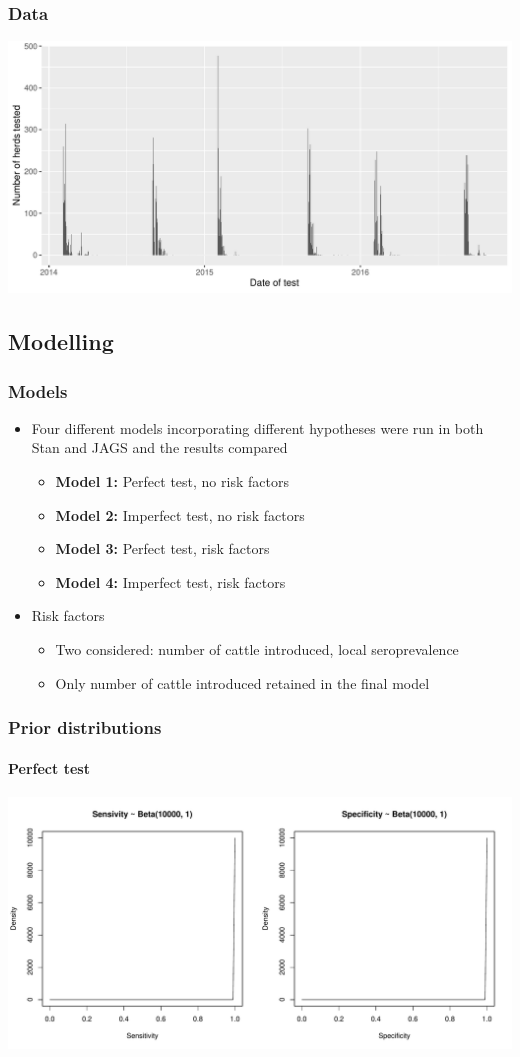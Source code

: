 \documentclass{beamer}
\begin{document}
\begin{frame}
\frametitle{Data}
\includegraphics[width=\textwidth]{imgs/distribution_of_test_dates.pdf}
\end{frame}

\subsection{Modelling}

\begin{frame}
\frametitle{Models}
\begin{itemize}
 \item{Four different models incorporating different hypotheses were run in both Stan and JAGS and the results compared}
 \begin{itemize}
  \item{\textbf{Model 1:} Perfect test, no risk factors}
  \item{\textbf{Model 2:} Imperfect test, no risk factors}
  \item{\textbf{Model 3:} Perfect test, risk factors}
  \item{\textbf{Model 4:} Imperfect test, risk factors}
 \end{itemize}
 \item<2->{Risk factors}
 \begin{itemize}
  \item{Two considered: number of cattle introduced, local seroprevalence}
  \item{Only number of cattle introduced retained in the final model}
 \end{itemize}
\end{itemize}
\end{frame}

\begin{frame}
\frametitle{Prior distributions}
\framesubtitle{Perfect test}
\includegraphics[width=\textwidth]{imgs/priors_perfect_test.pdf}
\end{frame}
\end{document}

